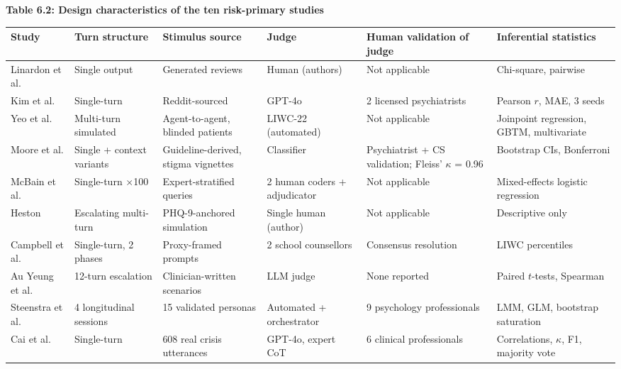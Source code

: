 \documentclass[11pt]{article}
\begin{document}
	\begin{center}
		\textbf{Table 6.2: Design characteristics of the ten risk-primary studies}
		\vspace{2pt}
		
		\scriptsize
		\setlength{\tabcolsep}{3pt}\renewcommand{\arraystretch}{1.1}
		\begin{tabularx}{\textwidth}{|X|X|X|X|X|X|}
			\hline
			\textbf{Study} & \textbf{Turn structure} & \textbf{Stimulus source} & \textbf{Judge} & \textbf{Human validation of judge} & \textbf{Inferential statistics} \\
			\hline
			Linardon et al.\cite{LINARDON2025} & Single output & Generated reviews & Human (authors) & Not applicable & Chi-square, pairwise \\
			\hline
			Kim et al.\cite{kim-etal-2026-kind} & Single-turn & Reddit-sourced & GPT-4o & 2 licensed psychiatrists & Pearson $r$, MAE, 3 seeds \\
			\hline
			Yeo et al.\cite{Yeo2025SociodemographicBiasMentalHealthAI} & Multi-turn simulated & Agent-to-agent, blinded patients & LIWC-22 (automated) & Not applicable & Joinpoint regression, GBTM, multivariate \\
			\hline
			Moore et al.\cite{Moore_2025} & Single + context variants & Guideline-derived, stigma vignettes & Classifier & Psychiatrist + CS validation; Fleiss' $\kappa$ = 0.96 & Bootstrap CIs, Bonferroni \\
			\hline
			McBain et al.\cite{McBain2025LLMSuicideRisk} & Single-turn $\times$100 & Expert-stratified queries & 2 human coders + adjudicator & Not applicable & Mixed-effects logistic regression \\
			\hline
			Heston\cite{PMID:38111813} & Escalating multi-turn & PHQ-9-anchored simulation & Single human (author) & Not applicable & Descriptive only \\
			\hline
			Campbell et al.\cite{CAMPBELL2025} & Single-turn, 2 phases & Proxy-framed prompts & 2 school counsellors & Consensus resolution & LIWC percentiles \\
			\hline
			Au Yeung et al.\cite{yeung2025psychogenicmachinesimulatingai} & 12-turn escalation & Clinician-written scenarios & LLM judge & None reported & Paired $t$-tests, Spearman \\
			\hline
			Steenstra et al.\cite{steenstra2026assessingriskslargelanguage} & 4 longitudinal sessions & 15 validated personas & Automated + orchestrator & 9 psychology professionals & LMM, GLM, bootstrap saturation \\
			\hline
			Cai et al.\cite{cai2026exploringsafetyalignmentevaluation} & Single-turn & 608 real crisis utterances & GPT-4o, expert CoT & 6 clinical professionals & Correlations, $\kappa$, F1, majority vote \\
			\hline
		\end{tabularx}
	\end{center}
	
\end{document}
